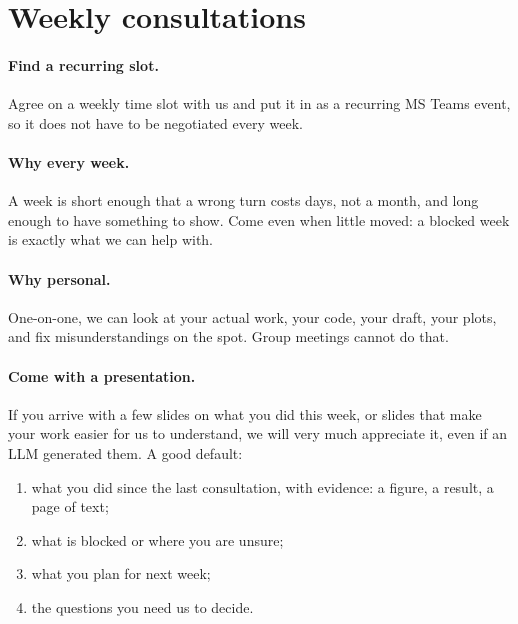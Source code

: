 \clearpage\section{Weekly consultations}\label{app:consult}
\paragraph{Find a recurring slot.} Agree on a weekly time slot with us and put it in as a recurring MS Teams event, so it does not have to be negotiated every week.

\paragraph{Why every week.} A week is short enough that a wrong turn costs days, not a month, and long enough to have something to show. Come even when little moved: a blocked week is exactly what we can help with.

\paragraph{Why personal.} One-on-one, we can look at your actual work, your code, your draft, your plots, and fix misunderstandings on the spot. Group meetings cannot do that.

\paragraph{Come with a presentation.} If you arrive with a few slides on what you did this week, or slides that make your work easier for us to understand, we will very much appreciate it, even if an LLM generated them. A good default:
\begin{enumerate}[noitemsep]
  \item what you did since the last consultation, with evidence: a figure, a result, a page of text;
  \item what is blocked or where you are unsure;
  \item what you plan for next week;
  \item the questions you need us to decide.
\end{enumerate}

